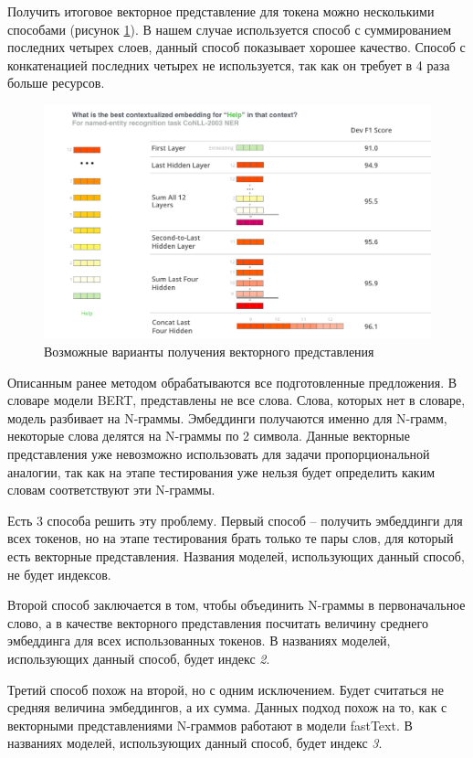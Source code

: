 \documentclass[a4paper,14pt]{article}
\begin{document}
Получить итоговое векторное представление для токена можно несколькими способами (рисунок \ref{fig:dif_vars_get_v}).
В нашем случае используется способ с суммированием последних четырех слоев, данный способ показывает хорошее качество.
Способ с конкатенацией последних четырех не используется, так как он требует в 4 раза больше ресурсов.

\begin{figure}[H]
	\centering
	\includegraphics[width=0.6\linewidth]{image/irvrsv9mefroz7io6ilnjng3fo4}
	\caption{Возможные варианты получения векторного представления}
	\label{fig:dif_vars_get_v}
\end{figure}

Описанным ранее методом обрабатываются все подготовленные предложения.
В словаре модели BERT, представлены не все слова.
Слова, которых нет в словаре, модель разбивает на N-граммы.
Эмбеддинги получаются именно для N-грамм, некоторые слова делятся на N-граммы по 2 символа.
Данные векторные представления уже невозможно использовать для задачи пропорциональной аналогии, так как на этапе тестирования уже нельзя будет определить каким словам соответствуют эти N-граммы.

Есть 3 способа решить эту проблему.
Первый способ -- получить эмбеддинги для всех токенов, но на этапе тестирования брать только те пары слов, для который есть векторные представления.
Названия моделей, использующих данный способ, не будет индексов.

Второй способ заключается в том, чтобы объединить N-граммы в первоначальное слово, а в качестве векторного представления посчитать величину среднего эмбеддинга для всех использованных токенов.
В названиях моделей, использующих данный способ, будет индекс \textit{2}.

Третий способ похож на второй, но с одним исключением.
Будет считаться не средняя величина эмбеддингов, а их сумма.
Данных подход похож на то, как с векторными представлениями N-граммов работают в модели fastText.
В названиях моделей, использующих данный способ, будет индекс \textit{3}.
\end{document}
